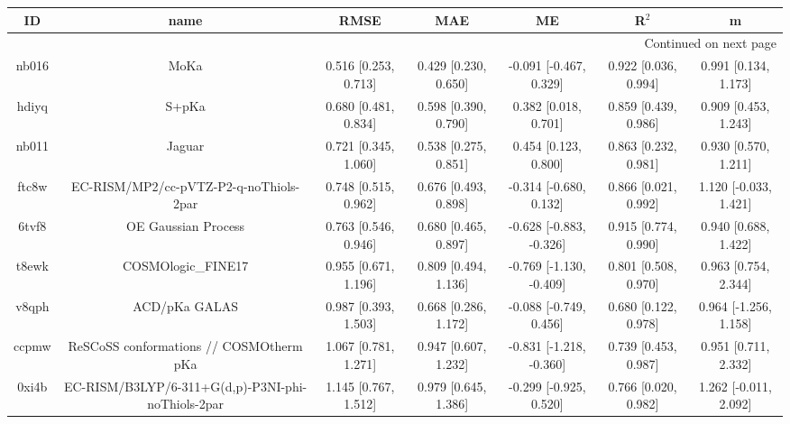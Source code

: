 \documentclass{article}
\begin{document}
\begin{center}
\begin{longtable}{|ccccccc|}
\toprule
    ID &                                               name &                     RMSE &                      MAE &                       ME &                 R$^2$ &                       m \\
\midrule
\endhead
\midrule
\multicolumn{7}{r}{{Continued on next page}} \\
\midrule
\endfoot

\bottomrule
\endlastfoot
 nb016 &                                               MoKa &     0.516 [0.253, 0.713] &     0.429 [0.230, 0.650] &   -0.091 [-0.467, 0.329] &  0.922 [0.036, 0.994] &    0.991 [0.134, 1.173] \\
 hdiyq &                                              S+pKa &     0.680 [0.481, 0.834] &     0.598 [0.390, 0.790] &     0.382 [0.018, 0.701] &  0.859 [0.439, 0.986] &    0.909 [0.453, 1.243] \\
 nb011 &                                             Jaguar &     0.721 [0.345, 1.060] &     0.538 [0.275, 0.851] &     0.454 [0.123, 0.800] &  0.863 [0.232, 0.981] &    0.930 [0.570, 1.211] \\
 ftc8w &             EC-RISM/MP2/cc-pVTZ-P2-q-noThiols-2par &     0.748 [0.515, 0.962] &     0.676 [0.493, 0.898] &   -0.314 [-0.680, 0.132] &  0.866 [0.021, 0.992] &   1.120 [-0.033, 1.421] \\
 6tvf8 &                                OE Gaussian Process &     0.763 [0.546, 0.946] &     0.680 [0.465, 0.897] &  -0.628 [-0.883, -0.326] &  0.915 [0.774, 0.990] &    0.940 [0.688, 1.422] \\
 t8ewk &                                 COSMOlogic\_FINE17 &     0.955 [0.671, 1.196] &     0.809 [0.494, 1.136] &  -0.769 [-1.130, -0.409] &  0.801 [0.508, 0.970] &    0.963 [0.754, 2.344] \\
 v8qph &                                      ACD/pKa GALAS &     0.987 [0.393, 1.503] &     0.668 [0.286, 1.172] &   -0.088 [-0.749, 0.456] &  0.680 [0.122, 0.978] &   0.964 [-1.256, 1.158] \\
 ccpmw &            ReSCoSS conformations // COSMOtherm pKa &     1.067 [0.781, 1.271] &     0.947 [0.607, 1.232] &  -0.831 [-1.218, -0.360] &  0.739 [0.453, 0.987] &    0.951 [0.711, 2.332] \\
 0xi4b &  EC-RISM/B3LYP/6-311+G(d,p)-P3NI-phi-noThiols-2par &     1.145 [0.767, 1.512] &     0.979 [0.645, 1.386] &   -0.299 [-0.925, 0.520] &  0.766 [0.020, 0.982] &   1.262 [-0.011, 2.092] \\

\end{longtable}
\end{center}
\end{document}
